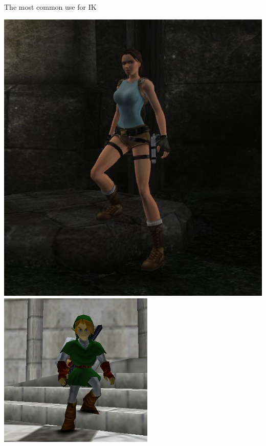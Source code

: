 \begin{frame}{The most common use for IK}
	\begin{center}
		\pause\includegraphics[height=0.4\textheight]{ik_feet3} \quad
		\pause\includegraphics[height=0.4\textheight]{ik_feet2}
		

\end{center}
\end{frame}
